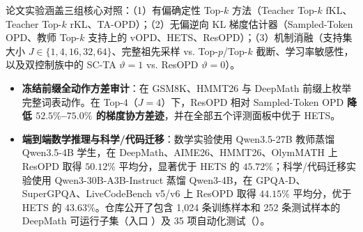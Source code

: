 \documentclass[lang=cn,scheme=chinese,openany]{elegantbook}
\begin{document}
论文实验涵盖三组核心对照：（1）有偏确定性 Top-$k$ 方法（Teacher Top-$k$ fKL、Teacher Top-$k$ rKL、TA-OPD）；（2）无偏逆向 KL 梯度估计器（Sampled-Token OPD、教师 Top-$k$ 支持上的 vOPD、HETS、ResOPD）；（3）机制消融（支持集大小 $J\in\{1,4,16,32,64\}$、完整祖先采样 vs. Top-$p$/Top-$k$ 截断、学习率敏感性，以及双控制族中的 SC-TA $\vartheta=1$ vs. ResOPD $\vartheta=0$）。
\begin{itemize}
\item \textbf{冻结前缀全动作方差审计}：在 GSM8K、HMMT26 与 DeepMath 前缀上枚举完整词表动作。在 Top-$4$（$J=4$）下，ResOPD 相对 Sampled-Token OPD \textbf{降低 $52.5\%$--$75.0\%$ 的梯度协方差迹}，并在全部五个评测面板中优于 HETS。
\item \textbf{端到端数学推理与科学/代码迁移}：数学实验使用 Qwen3.5-27B 教师蒸馏 Qwen3.5-4B 学生，在 DeepMath、AIME26、HMMT26、OlymMATH 上 ResOPD 取得 \textbf{$50.12\%$} 平均分，显著优于 HETS 的 \textbf{$45.72\%$}；科学/代码迁移实验使用 Qwen3-30B-A3B-Instruct 蒸馏 Qwen3-4B，在 GPQA-D、SuperGPQA、LiveCodeBench v5/v6 上 ResOPD 取得 \textbf{$44.15\%$} 平均分，优于 HETS 的 \textbf{$43.63\%$}。仓库公开了包含 1,024 条训练样本和 252 条测试样本的 DeepMath 可运行子集（入口 ）及 35 项自动化测试（）。
\end{itemize}

\backmatter
\end{document}
